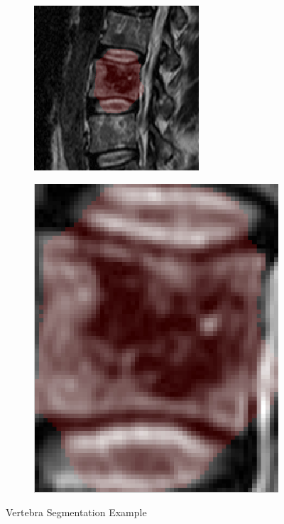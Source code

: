 \documentclass{article}
\begin{document}
{    \begin{figure}[h]
    	\centering
    	\begin{subfigure}[t]{0.45\linewidth}
    		\centering
    		\includegraphics[scale=1.4]{VertebraSegmentationExample_1.png}
    		
    	\end{subfigure}
    	\hfill
    	\begin{subfigure}[t]{0.45\linewidth}
    		\centering
    		\includegraphics[scale=0.4]{VertebraSegmentationExample_2.png}
    	\end{subfigure}
    	\caption{Vertebra Segmentation Example}
    \end{figure} 
  }	
  \pagebreak
\end{document}
